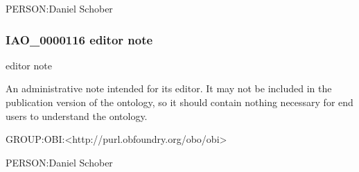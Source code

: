 \documentclass[letterpaper,10pt,english]{sphinxmanual}
\begin{document}
\begin{sphinxShadowBox}

\sphinxAtStartPar
PERSON:Daniel Schober
\end{sphinxShadowBox}
\begin{quote}

\ignorespaces \end{quote}


\subsubsection{IAO\_0000116 \sphinxhyphen{} editor note}
\label{\detokenize{doc-IAO_0000116:iao-0000116-editor-note}}\label{\detokenize{doc-IAO_0000116:index-0}}\label{\detokenize{doc-IAO_0000116::doc}}
\begin{sphinxShadowBox}

\sphinxAtStartPar
editor note
\end{sphinxShadowBox}

\begin{sphinxShadowBox}

\sphinxAtStartPar
An administrative note intended for its editor. It may not be included in the publication version of the ontology, so it should contain nothing necessary for end users to understand the ontology.
\end{sphinxShadowBox}

\begin{sphinxShadowBox}

\sphinxAtStartPar
GROUP:OBI:\textless{}http://purl.obfoundry.org/obo/obi\textgreater{}
\end{sphinxShadowBox}

\begin{sphinxShadowBox}

\sphinxAtStartPar
PERSON:Daniel Schober
\end{sphinxShadowBox}
\begin{quote}

\ignorespaces \end{quote}
\end{document}

